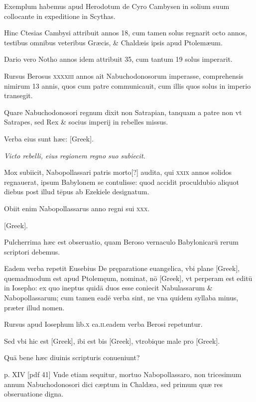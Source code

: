 \begin{parnumbers}
Exemplum habemus apud
Herodotum de Cyro Cambysen in solium suum collocante in expeditione
in Scythas.

Hinc Ctesias Cambysi attribuit annos 18,
cum tamen solus regnarit octo annos, testibus omnibus veteribus
Græcis, \& Chaldæis ipsis apud Ptolemæum.

Dario vero Notho annos
idem attribuit 35, cum tantum 19 solus imperarit.

Rursus Berosus
\textsc{xxxxiii} annos ait Nabuchodonosorum imperasse, comprehensis
nimirum 13 annis, quos cum patre communicauit, cum
illis quos solus in imperio transegit.

Quare Nabuchodonosori regnum
dixit non Satrapian, tanquam a patre non vt Satrapes, sed Rex
\& socius imperij in rebelles missus.

Verba eius sunt hæc: \textgreek{[Greek]}.

\textit{Victo rebelli, eius regionem regno suo subiecit.}

Mox subiicit, Nabopollassari patris morto[?]
audita, qui \textsc{xxix} annos solidos regnauerat, ipsum Babylonem se
contulisse: quod accidit proculdubio aliquot diebus post illud tēpus
ab Ezekiele designatum.

Obiit enim Nabopollassarus anno regni
sui \textsc{xxx}.

\textgreek{[Greek]}.

Pulcherrima hæc est obseruatio, quam Beroso vernaculo
Babylonicarū rerum scriptori debemus.

Eadem verba repetit Eusebius
De pręparatione euangelica, vbi plane \textgreek{[Greek]}, quemadmodum
est apud Ptolemęum, nominat, nō \textgreek{[Greek]}, vt perperam
est editū in Iosepho: ex quo ineptus quidā duos esse coniecit
Nabulassarum \& Nabopollassarum; cum tamen eadē verba sint, ne
vna quidem syllaba minus, præter illud nomen.

Rursus apud Iosephum
lib.\textsc{x} ca.\textsc{ii}.eadem verba Berosi repetuntur.

Sed vbi hic est \textgreek{[Greek]},
ibi est bis \textgreek{[Greek]}, vtrobique male pro \textgreek{[Greek]}.

Quā bene hæc diuinis scripturis conueniunt?

\clearpage
p. XIV [pdf 41]
Vnde etiam sequitur, mortuo Nabopollassaro, non tricesimum annum Nabuchodonosori
dici cæptum in Chaldæa, sed primum quæ res obseruatione
digna.


\end{parnumbers}
